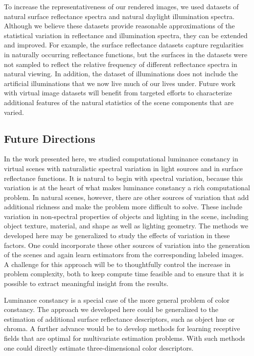 \documentclass{jov}
\begin{document}
To increase the representativeness of our rendered images, we used datasets of  natural surface reflectance spectra and natural daylight illumination spectra.
Although we believe these datasets provide reasonable approximations of the statistical variation in reflectance and illumination spectra, they can be extended and improved.
For example, the surface reflectance datasets capture regularities in naturally occurring reflectance functions, but the surfaces in the datasets were not sampled to reflect the relative frequency of different reflectance spectra in natural viewing. 
In addition, the dataset of illuminations does not include the artificial illuminations that we now live much of our lives under.
Future work with virtual image datasets will benefit from targeted efforts to characterize additional features of the natural statistics of the scene components that are varied.

\subsection{Future Directions}
In the work presented here, we studied computational luminance constancy in virtual scenes with naturalistic spectral variation in light sources and in surface reflectance functions. 
It is natural to begin with spectral variation, because this variation is at the heart of what makes luminance constancy a rich computational problem.
In natural scenes, however, there are other sources of variation that add additional richness and make the problem more difficult to solve.
These include variation in non-spectral properties of objects and lighting in the scene, including object texture, material, and shape as well as lighting geometry. 
The methods we developed here may be generalized to study the effects of variation in these factors.
One could incorporate these other sources of variation into the generation of the scenes and again learn estimators from the corresponding labeled images. 
A challenge for this approach will be to thoughtfully control the increase in problem complexity, both to keep compute time feasible and to ensure that it is possible to extract meaningful insight from the results.

Luminance constancy is a special case of the more general problem of color constancy.
The approach we developed here could be generalized to the estimation of additional surface reflectance descriptors, such as object hue or chroma.
A further advance would be to develop methods for learning receptive fields that are optimal for multivariate estimation problems. 
With such methods one could directly estimate three-dimensional color descriptors.
\end{document}
